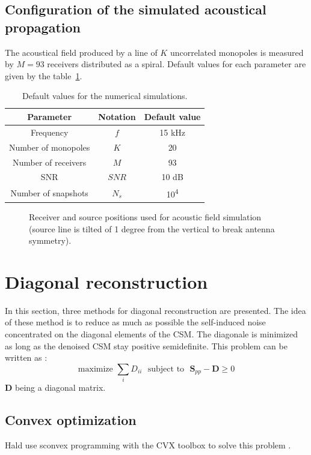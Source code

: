 \documentclass[fontsize=12pt,DIV13,paper=a4,abstract=true,titlepage=false]{scrartcl}
\newcommand{\bo}[1]{ \mathbf{#1} }
\begin{document}
\subsection{Configuration of the simulated acoustical propagation}
The acoustical field produced by a line of $K$ uncorrelated monopoles is measured by $M=93$ receivers  distributed as a spiral.
Default values for each parameter are given by the table~\ref{default_values}.
\begin{table}[H]
	\centering
	\begin{tabular}{c|c|c}
		\textbf{Parameter} & \textbf{Notation} & \textbf{Default value}\\\hline
		Frequency	&	$f$ 	&	15 kHz\\ \hline
		Number of monopoles	&	$K$	&	20\\ \hline
		Number of receivers	&	$M$ 	&	93\\ \hline
		SNR	&	$SNR$	&	10 dB\\ \hline
		Number of snapshots	&	$N_s$	&	10\textsuperscript{4}
	\end{tabular}
	\caption{Default values for the numerical simulations. \label{default_values}}

\end{table}

\begin{figure}[H]
	\centering
	
	\caption{Receiver and source positions used for acoustic field simulation (source line is tilted of 1 degree from the vertical to break antenna symmetry).}
\end{figure}


\section{Diagonal reconstruction}
In this section, three methods for diagonal reconstruction are presented. The idea of these method is to reduce as much as possible the self-induced noise concentrated on the diagonal elements of the CSM. The diagonale is minimized as long as the denoised CSM stay positive semidefinite. This problem can be written as : 
\begin{equation}
    \text{maximize~} \sum_i D_{ii} \text{~~subject to~~} \bo{S}_{pp}-\bo{D}\geq 0
\end{equation}
$\bo{D}$ being a diagonal matrix.\\

 \subsection{Convex optimization}
 Hald use sconvex programming with the CVX toolbox \cite{cvx,Grant_cvx} to solve this problem \cite{Hald2017}.
\end{document}

